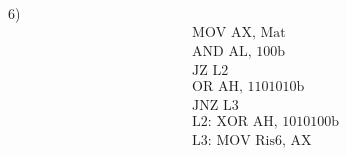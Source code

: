 \newcommand{\XOR}{\text{\textrm{\color{red}{XOR}}}}

\newcommand*{\circled}[2][red]{
	\tikz[baseline=(char.base)]{
		\node[shape=ellipse,inner sep=2pt,
		draw=#1,
		] (char) {#2};}
}

\newcommand{\markcells}[3][green]{
	\tikz[baseline=(char.mid)]{\node[shape=ellipse,overlay,draw,#1]{\phantom{\rule{#2}{#3}}};}%
}

\newcommand{\negatoA}{\overline{\text{A}}}
\newcommand{\negatoB}{\overline{\text{B}}}
\newcommand{\negatoC}{\overline{\text{C}}}
\newcommand{\negatoD}{\overline{\text{D}}}
\newcommand{\negatoE}{\overline{\text{E}}}

\newcommand{\negatoAbar}{\bar{\text{A}}}
\newcommand{\negatoBbar}{\bar{\text{B}}}
\newcommand{\negatoCbar}{\bar{\text{C}}}
\newcommand{\negatoDbar}{\bar{\text{D}}}
\newcommand{\negatoEbar}{\bar{\text{E}}}

\newcommand{\A}{\text{A}}
\newcommand{\B}{\text{B}}
\newcommand{\C}{\text{C}}
\newcommand{\D}{\text{D}}
\newcommand{\E}{\text{E}}

\newcommand{\distr}{\textrm{\color{red} DISTRIBUTIVE LAW}}
\newcommand{\inverse}{\textrm{\color{red} INVERSE LAW}}
\newcommand{\demorgan}{\textrm{\color{red} DE MORGAN}}
\newcommand{\nulllaw}{\textrm{\color{red} NULL LAW}}
\newcommand{\identity}{\textrm{\color{red} IDENTITY LAW}}
\newcommand{\absorption}{\textrm{\color{red} ABSORPTION LAW}}
\newcommand{\indemp}{\textrm{\color{red} IDEMPOTENT LAW}}

\newcommand{\SOLUZIONE}{\textrm{\textcolor{red}{SOLUZIONE}}}

\newcommand{\logicAND}{\text{{\tiny AND}}}
\newcommand{\logicOR}{\text{{\tiny OR}}}
\newcommand{\logicXOR}{\text{{\tiny XOR}}}


\textsf{\large{\color{red} 6) }} \\

\begin{align*}
	&\text{MOV AX, Mat} \\
	&\text{AND AL, 100b} \\
	&\text{JZ L2} \\
	&\text{OR AH, 1101010b} \\
	&\text{JNZ L3} \\
	&\text{L2: XOR AH, 1010100b} \\
	&\text{L3: MOV Ris6, AX} \\
\end{align*}

